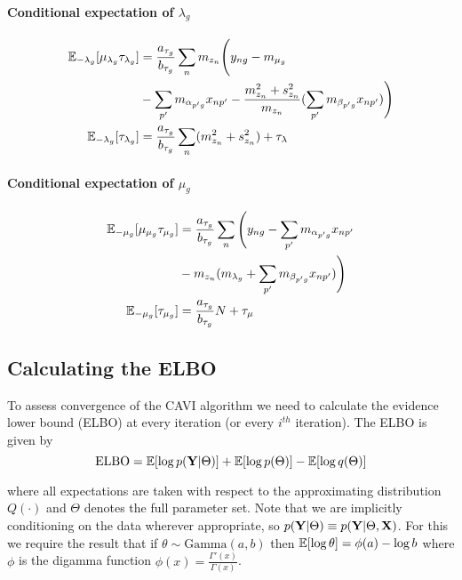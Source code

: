\paragraph{Conditional expectation of $\lambda_g$}
\begin{equation}
\begin{aligned}
\mathbb{E}_{-\lambda_g}[\mu_{\lambda_g} \tau_{\lambda_g}] & = \frac{a_{\tau_g}}{b_{\tau_g}}
\sum_n m_{z_n} \Bigg(
y_{ng} - m_{\mu_g} \\
&  - \sum_{p'} m_{\alpha_{p'g}} x_{np'} -
\frac{m_{z_n}^2 + s_{z_n}^2}{m_{z_n}} (\sum_{p'} m_{\beta_{p'g}} x_{np'})
\Bigg) \\
\mathbb{E}_{-\lambda_g}[\tau_{\lambda_g}] & = \frac{a_{\tau_g}}{b_{\tau_g}} \sum_n(m_{z_n}^2 + s_{z_n}^2) + \tau_\lambda
\end{aligned}
\end{equation}

\paragraph{Conditional expectation of $\mu_g$}
\begin{equation}
\begin{aligned}
\mathbb{E}_{-\mu_g}[\mu_{\mu_g} \tau_{\mu_g}] & =  \frac{a_{\tau_g}}{b_{\tau_g} }
\sum_n \Bigg(
y_{ng} - \sum_{p'} m_{\alpha_{p'g}} x_{np'} \\
& - m_{z_n}(
m_{\lambda_g} + \sum_{p'} m_{\beta_{p'g}} x_{np'})
\Bigg) \\
\mathbb{E}_{-\mu_g}[\tau_{\mu_g}] & =  \frac{a_{\tau_g}}{b_{\tau_g}} N + \tau_\mu
\end{aligned}
\end{equation}

\subsection{Calculating the ELBO}

To assess convergence of the CAVI algorithm we need to calculate the evidence lower bound (ELBO) at every iteration (or every $i^{th}$ iteration). The ELBO is given by
\begin{equation}
\text{ELBO} = \mathbb{E}[\log p({\bf Y} | \Theta)] + \mathbb{E}[\log p(\Theta)] - \mathbb{E}[\log q(\Theta)]
\end{equation}

where all expectations are taken with respect to the approximating distribution $Q(\cdot)$ and $\Theta$ denotes the full parameter set. Note that we are implicitly conditioning on the data wherever appropriate, so $p({\bf Y} | \Theta) \equiv p({\bf Y} | \Theta, {\bf X})$. For this we require the result that if $\theta \sim \text{Gamma}(a, b)$ then $\mathbb{E}[\log \theta] = \phi(a) - \log b$ where $\phi$ is the digamma function $\phi(x) = \frac{\Gamma'(x)}{\Gamma(x)}$.

